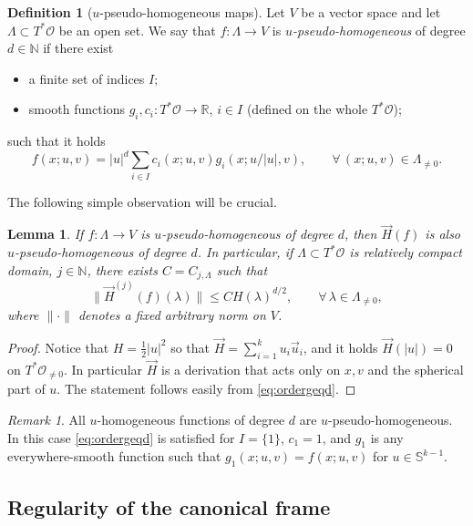 \documentclass[11pt,a4paper]{article}
\theoremstyle{plain}
\newtheorem{lemma}[theorem]{Lemma}
\theoremstyle{definition}
\newtheorem{definition}[theorem]{Definition}
\theoremstyle{remark}
\newtheorem{remark}[theorem]{Remark}
\numberwithin{equation}{section}
\newcommand{\R}{\mathbb{R}} %
\newcommand{\N}{\mathbb{N}} %
\begin{document}
\begin{definition}[$u$-pseudo-homogeneous maps]\label{def:pseudohom}
Let $V$ be a vector space and let $\Lambda\subset T^*\mathcal{O}$ be an open set. We say that $f: \Lambda \to V$ is \emph{$u$-pseudo-homogeneous} of degree $d\in \N$ if there exist
\begin{itemize}
\item a finite set of indices $I$;
\item smooth functions $g_i,c_i:T^*\mathcal{O}\to \R$, $i\in I$ (defined on the whole $T^*\mathcal{O}$);
\end{itemize}
such that it holds
\begin{equation}\label{eq:ordergeqd}
f(x;u,v) = |u|^d \sum_{i\in I} c_i(x;u,v) g_i(x;u/|u|,v), \qquad \forall\, (x;u,v) \in \Lambda_{\neq 0}.
\end{equation}
\end{definition}
The following simple observation will be crucial.
\begin{lemma}\label{l:property}
If $f:\Lambda \to V$ is $u$-pseudo-homogeneous of degree $d$, then $\vec{H}(f)$ is also $u$-pseudo-homogeneous of degree $d$. In particular, if $\Lambda\subset T^*\mathcal{O}$ is relatively compact domain, $j\in \N$, there exists $C=C_{j,\Lambda}$ such that
\begin{equation}
\|\vec{H}^{(j)}(f)(\lambda)\| \leq C H(\lambda)^{d/2}, \qquad \forall\, \lambda \in \Lambda_{\neq 0},
\end{equation}
where $\|\cdot\|$ denotes a fixed arbitrary norm on $V$.
\end{lemma}
\begin{proof}
Notice that $H=\tfrac{1}{2}|u|^2$ so that $\vec{H} = \sum_{i=1}^k u_i\vec{u}_i$, and it holds $\vec{H}(|u|)=0$ on $T^*\mathcal{O}_{\neq 0}$. In particular $\vec{H}$ is a derivation that acts only on $x,v$ and the spherical part of $u$. The statement follows easily from \eqref{eq:ordergeqd}.
\end{proof}
\begin{remark}
All $u$-homogeneous functions of degree $d$ are $u$-pseudo-homogeneous. In this case \eqref{eq:ordergeqd} is satisfied for $I=\{1\}$, $c_1=1$, and $g_1$ is any everywhere-smooth function such that $g_1(x;u,v) = f(x;u,v)$ for $u\in \mathbb{S}^{k-1}$.
\end{remark}

\subsection{Regularity of the canonical frame}
\end{document}
